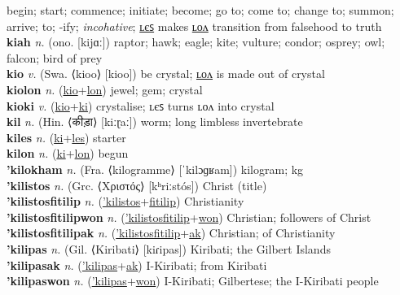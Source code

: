 begin; start; commence; initiate; become; go to; come to; change to; summon; arrive; to; -ify; \textit{incohative}; \hyperref[kiles]{ʟєꜱ} makes \hyperref[kilon]{ʟᴏᴧ} transition from falsehood to truth \label{ki} \\
\textbf{kiah} \textit{n.} (ono. [kijɑː])
raptor; hawk; eagle; kite; vulture; condor; osprey; owl; falcon; bird of prey \label{kiah} \\
\textbf{kio} \textit{v.} (Swa. ⟨kioo⟩ [kioo])
be crystal; \hyperref[kiolon]{ʟᴏᴧ} is made out of crystal \label{kio} \\
\textbf{kiolon} \textit{n.} (\hyperref[kio]{kio}+\hyperref[lon]{lon})
jewel; gem; crystal \label{kiolon} \\
\textbf{kioki} \textit{v.} (\hyperref[kio]{kio}+\hyperref[ki]{ki})
crystalise; ʟєꜱ turns ʟᴏᴧ into crystal \label{kioki} \\
\textbf{kil} \textit{n.} (Hin. ⟨कीड़ा⟩ [kiːɽaː])
worm; long limbless invertebrate \label{kil} \\
\textbf{kiles} \textit{n.} (\hyperref[ki]{ki}+\hyperref[les]{les})
starter \label{kiles} \\
\textbf{kilon} \textit{n.} (\hyperref[ki]{ki}+\hyperref[lon]{lon})
begun \label{kilon} \\
\textbf{'kilokham} \textit{n.} (Fra. ⟨kilogramme⟩ [ˈkilɔɡʁam])
kilogram; kg \label{'kilokham} \\
\textbf{'kilistos} \textit{n.} (Grc. ⟨Χριστός⟩ [kʰriːstós])
Christ (title) \label{'kilistos} \\
\textbf{'kilistosfitilip} \textit{n.} (\hyperref['kilistos]{'kilistos}+\hyperref[fitilip]{fitilip})
Christianity \label{'kilistosfitilip} \\
\textbf{'kilistosfitilipwon} \textit{n.} (\hyperref['kilistosfitilip]{'kilistosfitilip}+\hyperref[won]{won})
Christian; followers of Christ \label{'kilistosfitilipwon} \\
\textbf{'kilistosfitilipak} \textit{n.} (\hyperref['kilistosfitilip]{'kilistosfitilip}+\hyperref[ak]{ak})
Christian; of Christianity \label{'kilistosfitilipak} \\
\textbf{'kilipas} \textit{n.} (Gil. ⟨Kiribati⟩ [kiɾipas])
Kiribati; the Gilbert Islands \label{'kilipas} \\
\textbf{'kilipasak} \textit{n.} (\hyperref['kilipas]{'kilipas}+\hyperref[ak]{ak})
I-Kiribati; from Kiribati \label{'kilipasak} \\
\textbf{'kilipaswon} \textit{n.} (\hyperref['kilipas]{'kilipas}+\hyperref[won]{won})
I-Kiribati; Gilbertese; the I-Kiribati people \label{'kilipaswon} \\
